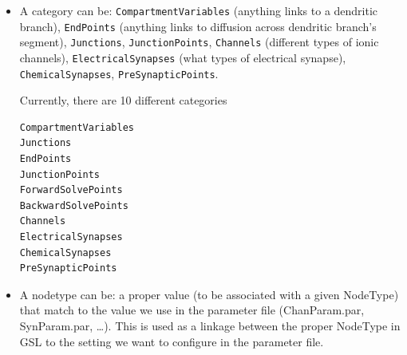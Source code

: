 

\begin{itemize}
  
  \item A category can be: \verb!CompartmentVariables! (anything links to a
  dendritic branch), \verb!EndPoints! (anything links to diffusion across
  dendritic branch's segment), \verb!Junctions!, \verb!JunctionPoints!,
  \verb!Channels! (different types of ionic channels),
  \verb!ElectricalSynapses! (what types of electrical synapse),
  \verb!ChemicalSynapses!, \verb!PreSynapticPoints!.

Currently, there are 10 different categories  
  \begin{verbatim}
CompartmentVariables
Junctions
EndPoints
JunctionPoints
ForwardSolvePoints
BackwardSolvePoints
Channels
ElectricalSynapses
ChemicalSynapses
PreSynapticPoints
\end{verbatim}
  
  \item A nodetype can be: a proper value (to be associated with a given
  NodeType) that match to the value we use in the parameter file (ChanParam.par,
  SynParam.par, \ldots). This is used as a linkage between the proper
  NodeType in GSL to the setting we want to configure in the parameter file.

% 

\end{itemize}




